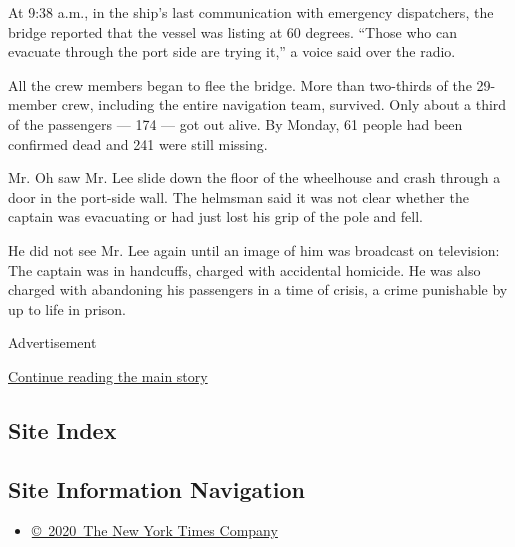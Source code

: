 At 9:38 a.m., in the ship's last communication with emergency
dispatchers, the bridge reported that the vessel was listing at 60
degrees. ``Those who can evacuate through the port side are trying it,''
a voice said over the radio.

All the crew members began to flee the bridge. More than two-thirds of
the 29-member crew, including the entire navigation team, survived. Only
about a third of the passengers --- 174 --- got out alive. By Monday, 61
people had been confirmed dead and 241 were still missing.

Mr. Oh saw Mr. Lee slide down the floor of the wheelhouse and crash
through a door in the port-side wall. The helmsman said it was not clear
whether the captain was evacuating or had just lost his grip of the pole
and fell.

He did not see Mr. Lee again until an image of him was broadcast on
television: The captain was in handcuffs, charged with accidental
homicide. He was also charged with abandoning his passengers in a time
of crisis, a crime punishable by up to life in prison.

Advertisement

\protect\hyperlink{after-bottom}{Continue reading the main story}

\hypertarget{site-index}{%
\subsection{Site Index}\label{site-index}}

\hypertarget{site-information-navigation}{%
\subsection{Site Information
Navigation}\label{site-information-navigation}}

\begin{itemize}
\tightlist
\item
  \href{https://help.nytimes3xbfgragh.onion/hc/en-us/articles/115014792127-Copyright-notice}{©~2020~The
  New York Times Company}
\end{itemize}

